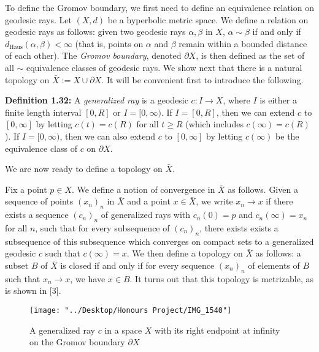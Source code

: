 \documentclass[12pt]{article}
\newcommand{\vs}{\vskip10pt}
\begin{document}
	\vs 
	
	To define the Gromov boundary, we first need to define an equivalence relation on geodesic rays. Let $(X,d)$ be a hyperbolic metric space. We define a relation on geodesic rays as follows: given two geodesic rays $\alpha, \beta$ in $X$, $\alpha \sim \beta$ if and only if $d_{\text{Haus}}(\alpha, \beta) < \infty$ (that is, points on $\alpha$ and $\beta$ remain within a bounded distance of each other). The \textit{Gromov boundary}, denoted $\partial X$,  is then defined as the set of all $\sim$ equivalence classes of geodesic rays. We show next that there is a natural topology on $\bar{X} := X \cup \partial X$. It will be convenient first to introduce the following. 
	
	\vs 
	
	\textbf{Definition 1.32: } A \textit{generalized ray} is a geodesic $c: I \rightarrow X$, where $I$ is either a finite length interval $[0, R]$ or $I = [0, \infty)$. If $I = [0, R]$, then we can extend $c$ to $[0, \infty]$ by letting $c(t) = c(R)$ for all $t \geq R$ (which includes $c(\infty) = c(R)$). If $I = [0, \infty)$, then we can also extend $c$ to $[0, \infty]$ by letting $c(\infty)$ be the equivalence class of $c$ on $\partial X$. 
	
	\vs 
	
	We are now ready to define a topology on $\bar{X}$. 
	
	\vs 
	
	Fix a point $p \in X$. We define a notion of convergence in $\bar{X}$ as follows. Given a sequence of points $(x_n)_{n}$ in $\bar{X}$ and a point $x \in \bar{X}$, we write $x_n \rightarrow x$ if there exists a sequence $(c_n)_n$ of generalized rays with $c_n(0) = p$ and $c_n(\infty) = x_n$ for all $n$, such that for every subsequence of $(c_n)_n$, there exists exists a subsequence of this subsequence which converges on compact sets to a generalized geodesic $c$ such that $c(\infty) = x$. We then define a topology on $\bar{X}$ as follows: a subset $B$ of $\bar{X}$ is closed if and only if for every sequence $(x_n)_n$ of elements of $B$ such that $x_n \rightarrow x$, we have $x \in B$. It turns out that this topology is metrizable, as is shown in [3]. 
	
	\vs
	
\begin{figure} [H]
	\centering
	\texttt{[image: "../Desktop/Honours Project/IMG\_1540"]}
	\caption{A generalized ray $c$ in a space $X$ with its right endpoint at infinity on the Gromov boundary $\partial X$}
	\label{fig:img1540}
\end{figure}
		
\end{document}
